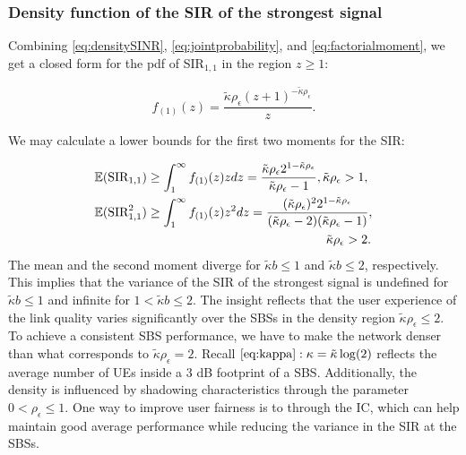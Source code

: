 \documentclass[lettersize,journal]{IEEEtran}
\begin{document}
\subsubsection{Density function of the SIR of the strongest signal}
Combining \eqref{eq:densitySINR}, \eqref{eq:jointprobability}, and \eqref{eq:factorialmoment}, we get a closed form for the pdf of SIR$_{1,1}$ in the region $z\geq 1$:


\begin{equation}
  \label{eq:SIR1}
  f_{(1)}(z) = \frac {\tilde{\kappa}\rho_{\epsilon}\left({z + 1} \right)^{-\tilde{\kappa}\rho_{\epsilon}}} {z}.
\end{equation}



We may calculate a lower bounds for the first two moments for the SIR:


\begin{align}
  &\mathbb{E}(\text{SIR}_{1,1})  \geq\int_{1}^{\infty}f_{(1)}(z)zdz=\frac{\tilde{\kappa}\rho_{\epsilon}2^{1-\tilde{\kappa}\rho_{\epsilon} }}{\tilde{\kappa}\rho_{\epsilon}-1}, \tilde{\kappa}\rho_{\epsilon} >1, \\
  &\mathbb{E}(\text{SIR}^2_{1,1}) \geq \int_{1}^{\infty}f_{(1)}(z)z^2dz = \frac{(\tilde{\kappa}\rho_{\epsilon}) ^2 2^{1-\tilde{\kappa}\rho_{\epsilon} }}{(\tilde{\kappa}\rho_{\epsilon} - 2)  (\tilde{\kappa}\rho_{\epsilon} - 1)}, \nonumber\\
  &\hspace{6.5cm}\tilde{\kappa}\rho_{\epsilon}>2 .
\end{align}
The mean and the second moment diverge for $\tilde{\kappa}b\leq 1$ and $\tilde{\kappa}b\leq 2$, respectively. This implies that the variance of the SIR of the strongest signal is undefined for $\tilde{\kappa}b \leq 1$ and infinite for $1 <\tilde{\kappa}b \leq 2$. The insight reflects that the user experience of the link quality varies significantly over the SBSs in the density region $\tilde{\kappa} \rho_{\epsilon} \leq 2$. To achieve a consistent SBS performance, we have to make the network denser than what corresponds to $\tilde{\kappa} \rho_{\epsilon} =2$. Recall $\eqref{eq:kappa}: \kappa = \tilde{\kappa}\log(2)$ reflects the average number of UEs inside a $3$ dB footprint of a SBS.  Additionally, the density is influenced by shadowing characteristics through the parameter  $0<\rho_{\epsilon} \leq 1$. One way to improve user fairness is to through the IC, which can help maintain good average performance while reducing the variance in the SIR at the SBSs.
\end{document}
